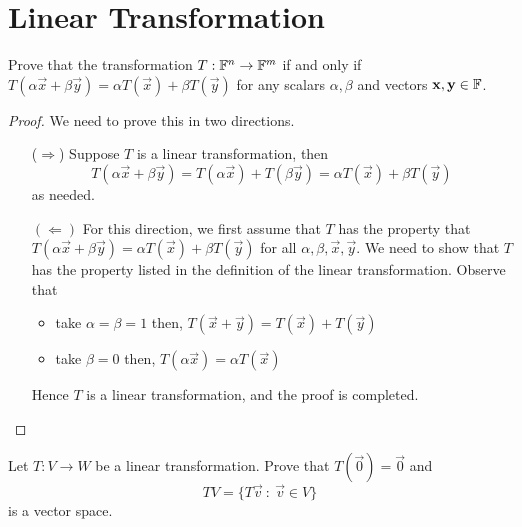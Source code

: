 \section{Linear Transformation}
\begin{homework}
  Prove that the transformation $T:\mathbb{F}^n\to\mathbb{F}^m$ if and only if 
  $T(\alpha\vec{x}+\beta\vec{y})=\alpha T(\vec{x})+\beta T(\vec{y})$
  for any scalars $\alpha,\beta$ and vectors 
  $\mathbf{x},\mathbf{y}\in\mathbb{F}$.
\end{homework}
\begin{proof}
  We need to prove this in two directions.
  \begin{itemize}
    \item[($\Rightarrow$)] Suppose $T$ is a linear transformation, 
      then 
      \[
        T(\alpha\vec{x}+\beta\vec{y})
        =T(\alpha\vec{x})+T(\beta\vec{y})
        =\alpha T(\vec{x})+\beta T(\vec{y})
      \]
      as needed.
    \item[$(\Leftarrow)$] For this direction, we first assume that
      $T$ has the property that 
      $T(\alpha\vec{x}+\beta\vec{y}) =\alpha T(\vec{x})+\beta T(\vec{y})$
      for all $\alpha,\beta,\vec{x},\vec{y}$. We need to show that
      $T$ has the property listed in the definition of the linear 
      transformation. Observe that
      \begin{itemize}
        \item take $\alpha=\beta=1$ then,
          $T(\vec{x}+\vec{y})=T(\vec{x})+T(\vec{y})$
        \item take $\beta=0$ then,
          $T(\alpha\vec{x})=\alpha T(\vec{x})$
      \end{itemize}
      Hence $T$ is a linear transformation, 
      and the proof is completed.
  \end{itemize}
\end{proof}
\begin{homework}
  Let $T:V\to W$ be a linear transformation. Prove that
  $T(\vec{0})=\vec{0}$ and 
  \[TV=\{T\vec{v}~:~\vec{v}\in V\}\]
  is a vector space.
\end{homework}
